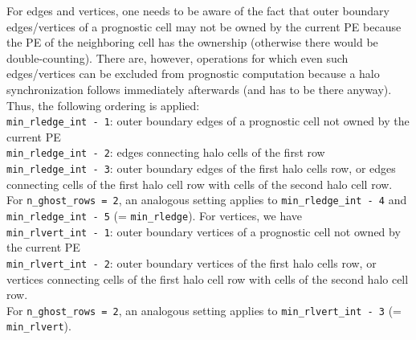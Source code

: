\documentclass[11pt]{article}
\begin{document}
For edges and vertices, one needs to be aware of the fact that outer boundary edges/vertices of a prognostic
cell may not be owned by the current PE because the PE of the neighboring cell has the ownership (otherwise
there would be double-counting). There are, however, operations for which even such edges/vertices can be 
excluded from prognostic computation because a halo synchronization follows immediately afterwards (and
has to be there anyway). Thus, the following ordering is applied: \\
\verb+min_rledge_int - 1+: outer boundary edges of a prognostic cell not owned by the current PE\\
\verb+min_rledge_int - 2+: edges connecting halo cells of the first row\\
\verb+min_rledge_int - 3+: outer boundary edges of the first halo cells row, or edges connecting cells
of the first halo cell row with cells of the second halo cell row.\\
For \verb+n_ghost_rows = 2+, an analogous setting applies to \verb+min_rledge_int - 4+ and 
\verb+min_rledge_int - 5+ (= \verb+min_rledge+). For vertices, we have\\
\verb+min_rlvert_int - 1+: outer boundary vertices of a prognostic cell not owned by the current PE\\
\verb+min_rlvert_int - 2+: outer boundary vertices of the first halo cells row, or vertices connecting cells
of the first halo cell row with cells of the second halo cell row.\\
For \verb+n_ghost_rows = 2+, an analogous setting applies to \verb+min_rlvert_int - 3+ 
(= \verb+min_rlvert+).
\end{document}
